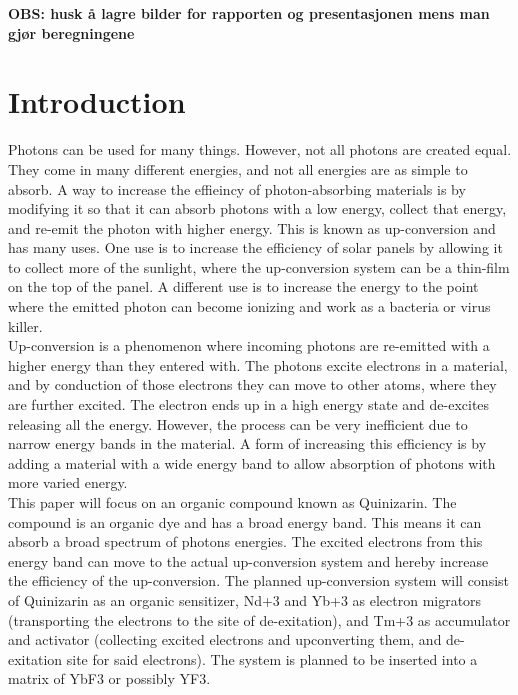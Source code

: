 \documentclass{article}
\begin{document}
\vspace{1cm}

\textbf{\large{OBS: husk å lagre bilder for rapporten og presentasjonen mens man gjør beregningene}}

\section{Introduction}  \label{sec:Introduction}

    Photons can be used for many things. However, not all photons are created equal. They come in many different energies, and not all energies are as simple to absorb. A way to increase the effieincy of photon-absorbing materials is by modifying it so that it can absorb photons with a low energy, collect that energy, and re-emit the photon with higher energy. This is known as up-conversion and has many uses. One use is to increase the efficiency of solar panels by allowing it to collect more of the sunlight, where the up-conversion system can be a thin-film on the top of the panel. A different use is to increase the energy to the point where the emitted photon can become ionizing and work as a bacteria or virus killer.\\

    Up-conversion is a phenomenon where incoming photons are re-emitted with a higher energy than they entered with. The photons excite electrons in a material, and by conduction of those electrons they can move to other atoms, where they are further excited. The electron ends up in a high energy state and de-excites releasing all the energy. However, the process can be very inefficient due to narrow energy bands in the material. A form of increasing this efficiency is by adding a material with a wide energy band to allow absorption of photons with more varied energy.\\

    This paper will focus on an organic compound known as Quinizarin. The compound is an organic dye and has a broad energy band. This means it can absorb a broad spectrum of photons energies. The excited electrons from this energy band can move to the actual up-conversion system and hereby increase the efficiency of the up-conversion. The planned up-conversion system will consist of Quinizarin as an organic sensitizer, Nd+3 and Yb+3 as electron migrators (transporting the electrons to the site of de-exitation), and Tm+3 as accumulator and activator (collecting excited electrons and upconverting them, and de-exitation site for said electrons). The system is planned to be inserted into a matrix of YbF3 or possibly YF3.\\
\end{document}
